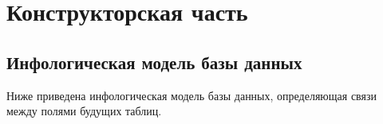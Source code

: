 \chapter{Конструкторская часть}
\label{cha:design}

\section{Инфологическая модель базы данных}
Ниже приведена инфологическая модель базы данных, определяющая связи между полями будущих таблиц.
